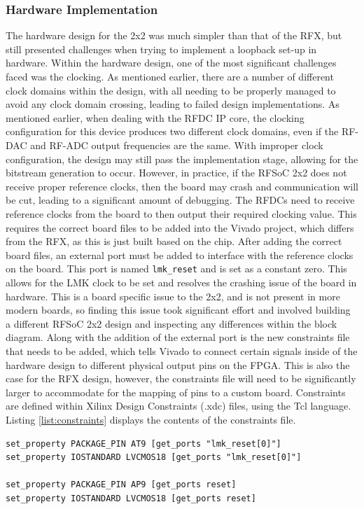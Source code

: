 \documentclass[12pt, a4paper]{article}
\begin{document}
\subsubsection{Hardware Implementation}

The hardware design for the 2x2 was much simpler than that of the RFX, but still presented challenges when trying to implement a loopback set-up in hardware. Within the hardware design, one of the most significant challenges faced was the clocking. As mentioned earlier, there are a number of different clock domains within the design, with all needing to be properly managed to avoid any clock domain crossing, leading to failed design implementations. As mentioned earlier, when dealing with the RFDC IP core, the clocking configuration for this device produces two different clock domains, even if the RF-DAC and RF-ADC output frequencies are the same. With improper clock configuration, the design may still pass the implementation stage, allowing for the bitstream generation to occur. However, in practice, if the RFSoC 2x2 does not receive proper reference clocks, then the board may crash and communication will be cut, leading to a significant amount of debugging. The RFDCs need to receive reference clocks from the board to then output their required clocking value. This requires the correct board files to be added into the Vivado project, which differs from the RFX, as this is just built based on the chip. After adding the correct board files, an external port must be added to interface with the reference clocks on the board. This port is named \texttt{lmk\_reset} and is set as a constant zero. This allows for the LMK clock to be set and resolves the crashing issue of the board in hardware. This is a board specific issue to the 2x2, and is not present in more modern boards, so finding this issue took significant effort and involved building a different RFSoC 2x2 design and inspecting any differences within the block diagram. Along with the addition of the external port is the new constraints file that needs to be added, which tells Vivado to connect certain signals inside of the hardware design to different physical output pins on the FPGA. This is also the case for the RFX design, however, the constraints file will need to be significantly larger to accommodate for the mapping of pins to a custom board. Constraints are defined within Xilinx Design Constraints (.xdc) files, using the Tcl language. Listing \ref{list:constraints} displays the contents of the constraints file.

\begin{listing}[h]
\begin{verbatim}
set_property PACKAGE_PIN AT9 [get_ports "lmk_reset[0]"]
set_property IOSTANDARD LVCMOS18 [get_ports "lmk_reset[0]"]

set_property PACKAGE_PIN AP9 [get_ports reset]
set_property IOSTANDARD LVCMOS18 [get_ports reset]
\end{verbatim}
\caption{Contents of \texttt{constraints.xdc} File for RFSoC 2x2 IPI Design}
\label{list:constraints}
\end{listing}
\end{document}
